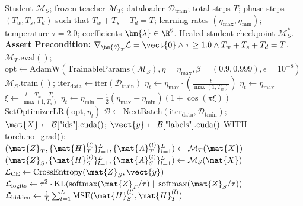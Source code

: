 \begin{algorithm}[H]
\caption[6-Pillar Distillation with Warmup-Stable-Decay (WSD)]{6-Pillar Distillation with Warmup-Stable-Decay (WSD)}
\label{alg:distillation_wsd}
\begin{algorithmic}[1]
\REQUIRE Student $\mathcal{M}_S$; frozen teacher $\mathcal{M}_T$; dataloader $\mathcal{D}_{\text{train}}$; total steps $T$; phase steps $(T_w, T_s, T_d)$ such that $T_w + T_s + T_d = T$; learning rates $(\eta_{\max}, \eta_{\min})$; temperature $\tau = 2.0$; coefficients $\bm{\lambda} \in \R^6$.
\ENSURE Healed student checkpoint $\mathcal{M}_S^*$.
\STATE \textbf{Assert Precondition:} $\nabla_{\bm{\theta}_T}\mathcal{L} = \vect{0} \land \tau \ge 1.0 \land T_w + T_s + T_d = T$.
\STATE $\mathcal{M}_T.\text{eval}()$; $\text{opt} \leftarrow \text{AdamW}(\text{TrainableParams}(\mathcal{M}_S), \eta=\eta_{\max}, \beta=(0.9, 0.999), \epsilon=10^{-8})$
\STATE $\mathcal{M}_S.\text{train}()$; $\text{iter}_{\text{data}} \leftarrow \text{iter}(\mathcal{D}_{\text{train}})$
    \STATE {}
        \STATE $\eta_t \leftarrow \eta_{\max} \cdot \left(\frac{t}{\max(1, T_w)}\right)$ 
        \STATE $\eta_t \leftarrow \eta_{\max}$ 
    \ELSE
        \STATE $\xi \leftarrow \frac{t - T_w - T_s}{\max(1, T_d)}$
        \STATE $\eta_t \leftarrow \eta_{\min} + \frac{1}{2}(\eta_{\max} - \eta_{\min}) (1 + \cos(\pi \xi))$ 
    \ENDIF
    \STATE $\text{SetOptimizerLR}(\text{opt}, \eta_t)$
    \STATE {}
    \STATE $\mathcal{B} \leftarrow \text{NextBatch}(\text{iter}_{\text{data}}, \mathcal{D}_{\text{train}})$; $\mat{X} \leftarrow \mathcal{B}[\text{"ids"}].\text{cuda}()$; $\vect{y} \leftarrow \mathcal{B}[\text{"labels"}].\text{cuda}()$
    \STATE WITH torch.no\_grad(): $(\mat{Z}_T, \{\mat{H}_T^{(l)}\}_{l=1}^L, \{\mat{A}_T^{(l)}\}_{l=1}^L) \leftarrow \mathcal{M}_T(\mat{X})$
    \STATE $(\mat{Z}_S, \{\mat{H}_S^{(l)}\}_{l=1}^L, \{\mat{A}_S^{(l)}\}_{l=1}^L) \leftarrow \mathcal{M}_S(\mat{X})$
    \STATE {}
    \STATE $\mathcal{L}_{\text{CE}} \leftarrow \text{CrossEntropy}(\mat{Z}_S, \vect{y})$
    \STATE $\mathcal{L}_{\text{logits}} \leftarrow \tau^2 \cdot \text{KL}(\operatorname{softmax}(\mat{Z}_T / \tau) \parallel \operatorname{softmax}(\mat{Z}_S / \tau))$
    \STATE $\mathcal{L}_{\text{hidden}} \leftarrow \frac{1}{L} \sum_{l=1}^L \text{MSE}(\mat{H}_S^{(l)}, \mat{H}_T^{(l)})$

\end{algorithmic}
\end{algorithm}
